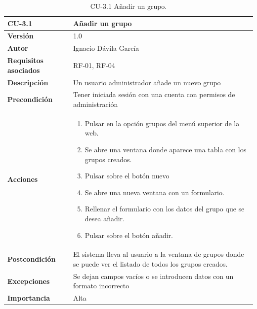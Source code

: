 \begin{table}[p]
	\centering
	\begin{tabularx}{\linewidth}{ p{} p{} }
		\toprule
		\textbf{CU-3.1}    & \textbf{Añadir un grupo}\\
		\toprule
		\textbf{Versión}              & 1.0    \\
		\textbf{Autor}                & Ignacio Dávila García \\
		\textbf{Requisitos asociados} & RF-01, RF-04 \\
		\textbf{Descripción}          & Un usuario administrador añade un nuevo grupo \\
		\textbf{Precondición}         & Tener iniciada sesión con una cuenta con permisos de administración \\
		\textbf{Acciones}             &
		\begin{enumerate}
			\def\labelenumi{\arabic{enumi}.}
			\tightlist
			\item Pulsar en la opción grupos del menú superior de la web.
			\item Se abre una ventana donde aparece una tabla con los grupos creados.
			\item Pulsar sobre el botón nuevo
			\item Se abre una nueva ventana con un formulario.
			\item Rellenar el formulario con los datos del grupo que se desea añadir.
			\item Pulsar sobre el botón añadir.
		\end{enumerate}\\
		\textbf{Postcondición}        & El sistema lleva al usuario a la ventana de grupos donde se puede ver el listado de todos los grupos creados. \\
		\textbf{Excepciones}          & Se dejan campos vacíos o se introducen datos con un formato incorrecto \\
		\textbf{Importancia}          & Alta \\
		\bottomrule
	\end{tabularx}
	\caption{CU-3.1 Añadir un grupo.}
\end{table}

